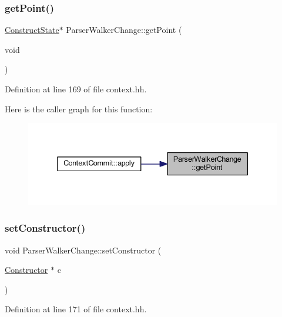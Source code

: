 \subsubsection{\texorpdfstring{getPoint()}{getPoint()}}
{\footnotesize\ttfamily \mbox{\hyperlink{struct_construct_state}{Construct\+State}}$\ast$ Parser\+Walker\+Change\+::get\+Point (\begin{DoxyParamCaption}\item[{void}]{ }\end{DoxyParamCaption})\hspace{0.3cm}{\ttfamily [inline]}}



Definition at line 169 of file context.\+hh.

Here is the caller graph for this function\+:
\nopagebreak
\begin{figure}[H]
\begin{center}
\leavevmode
\includegraphics[width=338pt]{class_parser_walker_change_aae58d318a27711b1188d825efe36a63d_icgraph}
\end{center}
\end{figure}
\mbox{\label{class_parser_walker_change_a4526bad75395a124aebb7cf7c2b09f1b}} 
\subsubsection{\texorpdfstring{setConstructor()}{setConstructor()}}
{\footnotesize\ttfamily void Parser\+Walker\+Change\+::set\+Constructor (\begin{DoxyParamCaption}\item[{\mbox{\hyperlink{class_constructor}{Constructor}} $\ast$}]{c }\end{DoxyParamCaption})\hspace{0.3cm}{\ttfamily [inline]}}



Definition at line 171 of file context.\+hh.

